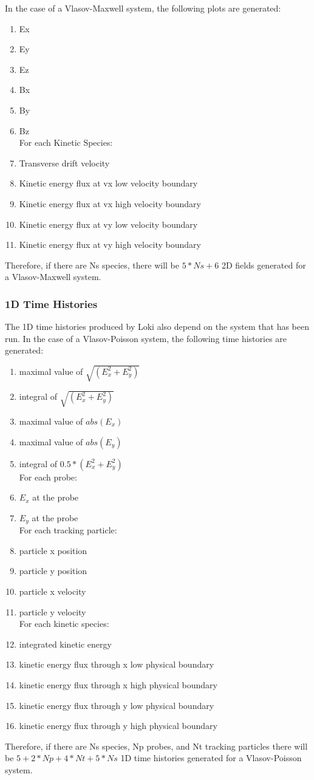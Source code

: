 \documentclass[11pt]{amsart}
\begin{document}
In the case of a Vlasov-Maxwell system, the following plots are generated:
\begin{enumerate}
\item Ex
\item Ey
\item Ez
\item Bx
\item By
\item Bz \\
For each Kinetic Species:
\item Transverse drift velocity
\item Kinetic energy flux at vx low velocity boundary
\item Kinetic energy flux at vx high velocity boundary
\item Kinetic energy flux at vy low velocity boundary
\item Kinetic energy flux at vy high velocity boundary
\end{enumerate}
Therefore, if there are Ns species, there will be $5*Ns+6$ 2D fields generated
for a Vlasov-Maxwell system.

\subsubsection*{1D Time Histories}
The 1D time histories produced by Loki also depend on the system that has been
run.  In the case of a Vlasov-Poisson system, the following time histories are
generated:
\begin{enumerate}
\item maximal value of $\sqrt{(E_x^2 + E_y^2)}$
\item integral of $\sqrt{(E_x^2 + E_y^2)}$
\item maximal value of $abs(E_x)$
\item maximal value of $abs(E_y)$
\item integral of  $0.5*(E_x^2 + E_y^2)$ \\
For each probe:
\item $E_x$ at the probe
\item $E_y $ at the probe \\
For each tracking particle:
\item particle x position
\item particle y position
\item particle x velocity
\item particle y velocity \\
For each kinetic species:
\item integrated kinetic energy
\item kinetic energy flux through x low physical boundary
\item kinetic energy flux through x high physical boundary
\item kinetic energy flux through y low physical boundary
\item kinetic energy flux through y high physical boundary
\end{enumerate}
Therefore, if there are Ns species, Np probes, and Nt tracking particles there
will be $5+2*Np+4*Nt+5*Ns$ 1D time histories generated for a Vlasov-Poisson
system.
\end{document}
